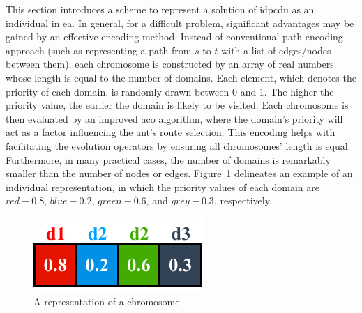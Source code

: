 This section introduces a scheme to represent a solution of \gls{idpcdu} as an individual in \gls{ea}. In general, for a difficult problem, significant advantages may be gained by an effective encoding method. Instead of conventional path encoding approach (such as representing a path from $s$ to $t$ with a list of edges/nodes between them), each chromosome is constructed by an array of real numbers whose length is equal to the number of domains. Each element, which denotes the priority of each domain, is randomly drawn between 0 and 1. The higher the priority value, the earlier the domain is likely to be visited. Each chromosome is then evaluated by an improved \gls{aco} algorithm, where the domain's priority will act as a factor influencing the ant's route selection. This encoding helps with facilitating the evolution operators by ensuring all chromosomes' length is equal. Furthermore, in many practical cases, the number of domains is remarkably smaller than the number of nodes or edges. 
Figure~\ref{fig:individual} delineates an example of an individual representation, in which the priority values of each domain are $red - 0.8$, $blue - 0.2$, $green - 0.6$, and $grey - 0.3$, respectively.
\setlength{\intextsep}{3pt}
\renewcommand{\scalefigure}{1.2}
\begin{figure}[htbp]
	\centering
	\includegraphics[scale=\scalefigure]{Figures/chap 3/Individual.pdf}
	\caption{A representation of a chromosome}
	\label{fig:individual}
\end{figure}